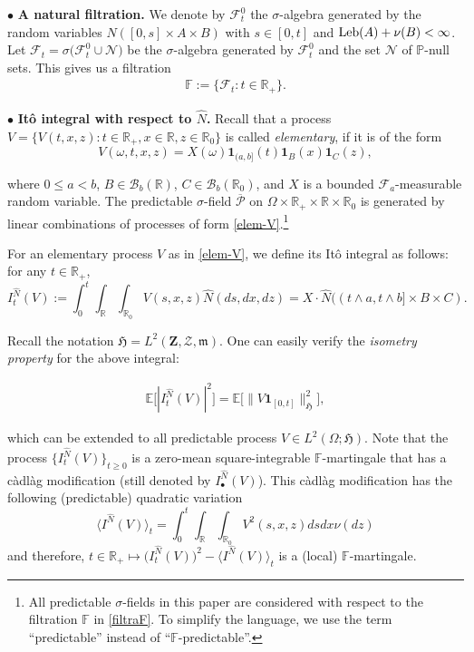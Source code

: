 \documentclass[letterpaper, 11pt,  reqno]{amsart}
\newcommand{\wh}{\widehat}
\newcommand{\noi}{\noindent}
\newcommand{\R}{\mathbb{R}}
\newcommand{\bul}{\bullet}
\newcommand{\bE}{\mathbb{E}}
\newcommand{\bR}{\mathbb{R}}
\newcommand{\cB}{\mathcal{B}}
\newcommand{\cP}{\mathcal{P}}
\newcommand{\s}{\sigma}
\renewcommand{\o}{\omega}
\newcommand{\ind}{\mathbf 1}
\newcommand{\PP}{\mathbb{P}}
\newcommand{\fm}{\mathfrak{m}}
\newcommand{\fH}{\mathfrak{H}}
\numberwithin{equation}{section}
\numberwithin{theorem}{section}
\begin{document}
\noi
$\bul$ {\bf A natural filtration.} We denote by $\mathcal{F}^0_t$ the $\s$-algebra
generated by the random variables
$N([0,s]\times A \times B)$ with $s \in [0,t]$ and 
$\textup{Leb}(A)+ \nu(B) < \infty$.
Let  $\mathcal{F}_t = \s\big( \mathcal{F}_t^0 \cup \mathcal{N} \big)$ be the
$\s$-algebra generated by $\mathcal{F}_t^0$ and  the set $\mathcal{N} $ of $\PP$-null sets.
This gives us a filtration
\begin{align}
\mathbb{F}:= \{ \mathcal{F}_t: t\in\R_+\}.
\label{filtraF}
\end{align}

 
 
 
 

\smallskip
\noi
$\bul$ {\bf It\^o integral with respect to $\wh{N}$.} 
Recall that a process $V=\{V(t,x,z):t\in \bR_{+},x\in \R,z\in \R_0\}$ is called {\em elementary},
 if it is of the form
\begin{equation}
\label{elem-V}
V(\o,t,x,z)=X(\omega) \ind_{(a,b]}(t) \ind_{B}(x)\ind_{C}(z), 
\end{equation}

\noi
where $0\leq a<b$, $B\in \cB_b(\R)$, $C \in \cB_b(\R_0)$, and $X$ is a bounded $\mathcal{F}_a$-measurable random variable.
The predictable  $\s$-field  $\overline{\cP}$ 
on $\Omega \times \bR_{+} \times \bR \times \bR_0$
is  generated by linear combinations of processes 
of form \eqref{elem-V}.\footnote{All  predictable $\s$-fields in this paper
 are considered with respect to the filtration $\mathbb{F}$ in \eqref{filtraF}.
  To simplify the language, we use the term ``predictable'' 
  instead of ``$\mathbb{F}$-predictable''.}
 

 For  an elementary  process $V$ as in \eqref{elem-V}, 
 we define its   It\^o integral
 as follows: for any $t\in\R_+$,
\[
I_t^{\wh N}(V):=\int_0^t \int_{\R}\int_{\R_0} V(s,x,z) \wh{N}(ds,dx,dz)
=X \cdot \wh{N}((t \wedge a,t\wedge b] \times B \times C).
\] 

\noi
Recall the notation  $\fH=L^2(\mathbf{Z}, \mathcal{Z},\fm)$. 
One can easily verify the {\em isometry property} for the above integral:

\noi
\begin{align}
\label{isometry}
\bE \big[|   I_t^{\wh N}  (V)|^2\big]=\bE \big[\|V \ind_{[0,t]} \|_{\fH}^2\big],
\end{align}

\noi
which  can be extended to all predictable process $V\in L^2(\Omega;\fH)$.
Note that  the process $\{I_t^{\wh N}(V)\}_{t\geq 0}$ is a zero-mean square-integrable 
$\mathbb{F}$-martingale that  has a c\`adl\`ag modification 
(still denoted by $I_\bul^{\wh N}(V)$). 
This   c\`adl\`ag modification  has 
 the following (predictable) quadratic variation
\[
\langle I^{\wh N}(V) \rangle_{t}=\int_0^t \int_{\R} \int_{\R_0} V^2(s,x,z)  ds dx \nu(dz)
\]
and therefore,
$t\in\R_+\mapsto
 \big( I_t^{\wh N}(V) \big)^2 - \langle I^{\wh N}(V) \rangle_{t}$  is 
a (local) $\mathbb{F}$-martingale. 
\end{document}
